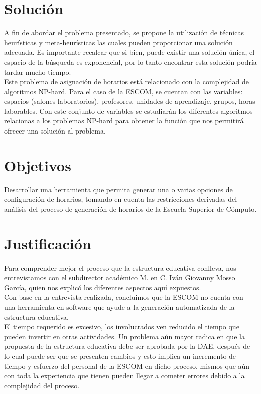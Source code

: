 \section{Solución}
	A fin de abordar el problema presentado, se propone la utilización de técnicas heurísticas y meta-heurísticas las cuales pueden proporcionar una solución adecuada. Es importante recalcar que si bien, puede existir una solución única, el espacio de la búsqueda es exponencial, por lo tanto encontrar esta solución podría tardar mucho tiempo. \\
	
	Este problema de asignación de horarios está relacionado con la complejidad de algoritmos NP-hard. Para el caso de la ESCOM, se cuentan con las variables: espacios (salones-laboratorios), profesores, unidades de aprendizaje, grupos, horas laborables. Con este conjunto de variables se estudiarán los diferentes algoritmos relacionas a los problemas NP-hard para obtener la función que nos permitirá ofrecer una solución al problema.

\section{Objetivos}
	Desarrollar una herramienta que permita generar una o varias opciones de configuración de horarios, tomando en cuenta las restricciones derivadas del análisis del proceso de generación de horarios de la Escuela Superior de Cómputo.

\section{Justificación}
	Para comprender mejor el proceso que la estructura educativa conlleva, nos entrevistamos con el subdirector académico M. en C. Iván Giovanny Mosso García, quien nos explicó los diferentes aspectos aquí expuestos. \\
	
	Con base en la entrevista realizada, concluimos que la ESCOM no cuenta con una herramienta en software que ayude a la generación automatizada de la estructura educativa.  \\
	
	El tiempo requerido es excesivo, los involucrados ven reducido el tiempo que pueden invertir en otras actividades. Un problema aún mayor radica en que la propuesta de la estructura educativa debe ser aprobada por la DAE, después de lo cual puede ser
	que se presenten cambios y esto implica un incremento de tiempo y esfuerzo del personal de la ESCOM en dicho proceso, mismos que aún con toda la experiencia que tienen pueden llegar a cometer errores debido a la complejidad del proceso.  \\
	
